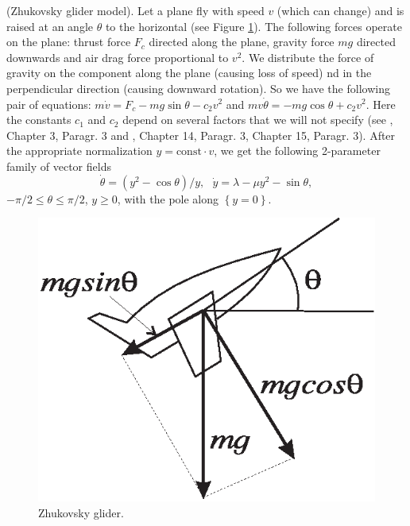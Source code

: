 \begin{example}(Zhukovsky glider model).
	Let a plane fly with speed $v$ (which can change) and is raised at an angle $\theta$ to the horizontal (see Figure \ref{fig:3.16}). The following forces operate on the plane: thrust force $F_c$ directed along the plane, gravity force $mg$ directed downwards and air drag force proportional to $v^2$. We distribute the force of gravity on the component along the plane (causing loss of speed) nd in the perpendicular direction (causing downward rotation). So we have the following pair of equations: $m\dot{v}=F_{c}-mg\sin
	\theta -c_{2}v^{2}$ and $mv\dot{\theta}=-mg\cos \theta +c_{2}v^{2}$. Here the constants $c_1$ and $c_2$ depend on several factors that we will not specify (see \cite{BNF}, Chapter 3, Paragr. 3 and \cite{BaLe}, Chapter 14, Paragr. 3, Chapter 15, Paragr. 3). After the appropriate normalization $y=\textrm{const}\cdot v$, we get the following 2-parameter family of vector fields
	\begin{equation}
	\label{3.14}
	\dot{\theta}=(y^{2}-\cos \theta )/y,\text{ \ \ }\dot{y}=\lambda -\mu
	y^{2}-\sin \theta ,
	\end{equation}
	$-\pi /2\leq \theta \leq \pi /2$, $y\geq 0$, with the pole along $\left\{ y=0\right\}$.
	
		\begin{figure}[!ht]
		\centering
		\includegraphics [scale=1.4]{jtr316}
		\caption{Zhukovsky glider.}
		\label{fig:3.16}
	\end{figure}
	

\end{example}
